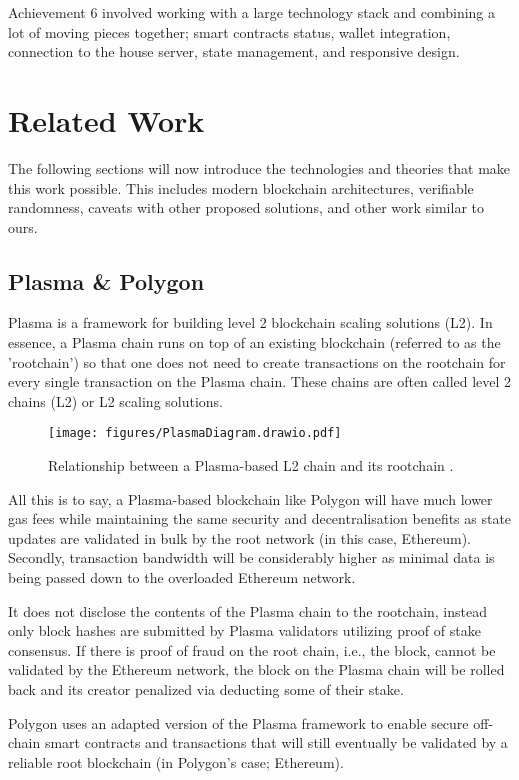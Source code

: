 \documentclass[10pt,journal,compsoc]{IEEEtran}
\begin{document}
Achievement 6 involved working with a large technology stack and combining a lot of moving pieces together; smart contracts status, wallet integration, connection to the house server, state management, and responsive design.
\section{Related Work}
The following sections will now introduce the technologies and theories that make this work possible. This includes modern blockchain architectures, verifiable randomness, caveats with other proposed solutions, and other work similar to ours.
\label{sec:related}
\subsection{Plasma \& Polygon}
\label{sec:polygon}
Plasma \cite{Poon2017} is a framework for building level 2 blockchain scaling solutions (L2). In essence, a Plasma chain runs on top of an existing blockchain (referred to as the 'rootchain') so that one does not need to create transactions on the rootchain for every single transaction on the Plasma chain. These chains are often called level 2 chains (L2) or L2 scaling solutions.

\begin{figure}[!h]
    \centering
    \texttt{[image: figures/PlasmaDiagram.drawio.pdf]}
    \caption{Relationship between a Plasma-based L2 chain and its rootchain \cite{Poon2017}.}
    \label{fig:plasma}
\end{figure}

All this is to say, a Plasma-based blockchain like Polygon will have much lower gas fees while maintaining the same security and decentralisation benefits as state updates are validated in bulk by the root network (in this case, Ethereum). Secondly, transaction bandwidth will be considerably higher as minimal data is being passed down to the overloaded Ethereum network. 

It does not disclose the contents of the Plasma chain to the rootchain, instead only block hashes are submitted by Plasma validators utilizing proof of stake consensus. If there is proof of fraud on the root chain, i.e., the block, cannot be validated by the Ethereum network, the block on the Plasma chain will be rolled back and its creator penalized via deducting some of their stake.

Polygon \cite{Kanani2021} uses an adapted version of the Plasma framework to enable secure off-chain smart contracts and transactions that will still eventually be validated by a reliable root blockchain (in Polygon's case; Ethereum). 
\end{document}
